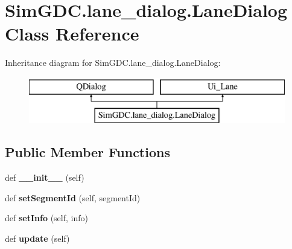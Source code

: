 \hypertarget{class_sim_g_d_c_1_1lane__dialog_1_1_lane_dialog}{}\section{Sim\+G\+D\+C.\+lane\+\_\+dialog.\+Lane\+Dialog Class Reference}
\label{class_sim_g_d_c_1_1lane__dialog_1_1_lane_dialog}
Inheritance diagram for Sim\+G\+D\+C.\+lane\+\_\+dialog.\+Lane\+Dialog\+:\begin{figure}[H]
\begin{center}
\leavevmode
\includegraphics[height=2.000000cm]{class_sim_g_d_c_1_1lane__dialog_1_1_lane_dialog}
\end{center}
\end{figure}
\subsection*{Public Member Functions}
\begin{DoxyCompactItemize}
\item 
\hypertarget{class_sim_g_d_c_1_1lane__dialog_1_1_lane_dialog_aeb304a5b202091a7d47a8dfe4eed568f}{}def {\bfseries \+\_\+\+\_\+init\+\_\+\+\_\+} (self)\label{class_sim_g_d_c_1_1lane__dialog_1_1_lane_dialog_aeb304a5b202091a7d47a8dfe4eed568f}

\item 
\hypertarget{class_sim_g_d_c_1_1lane__dialog_1_1_lane_dialog_a55f9d46bbdc9c94c97af4fbab82cfc73}{}def {\bfseries set\+Segment\+Id} (self, segment\+Id)\label{class_sim_g_d_c_1_1lane__dialog_1_1_lane_dialog_a55f9d46bbdc9c94c97af4fbab82cfc73}

\item 
\hypertarget{class_sim_g_d_c_1_1lane__dialog_1_1_lane_dialog_a3aae9751e93d910fda7e8bd4c448ecff}{}def {\bfseries set\+Info} (self, info)\label{class_sim_g_d_c_1_1lane__dialog_1_1_lane_dialog_a3aae9751e93d910fda7e8bd4c448ecff}

\item 
\hypertarget{class_sim_g_d_c_1_1lane__dialog_1_1_lane_dialog_af0e98a74b33bb5dac28a99ca50a947c9}{}def {\bfseries update} (self)\label{class_sim_g_d_c_1_1lane__dialog_1_1_lane_dialog_af0e98a74b33bb5dac28a99ca50a947c9}

\end{DoxyCompactItemize}
